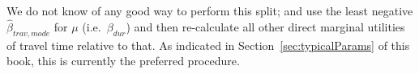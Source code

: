 


We do not know of any good way to perform this split; \citet{KickhoeferEtAl2011PolicyEvaluationIncome} and \citet{Kickhoefer_PhDThesis_2014} use the least negative $\hat\beta_{trav,mode}$ for $\mu$ (i.e.\ $\beta_{dur}$) and then re-calculate all other direct marginal utilities of travel time relative to that. As indicated in Section~\ref{sec:typicalParams} of this book, this is currently the preferred procedure.
%
%

